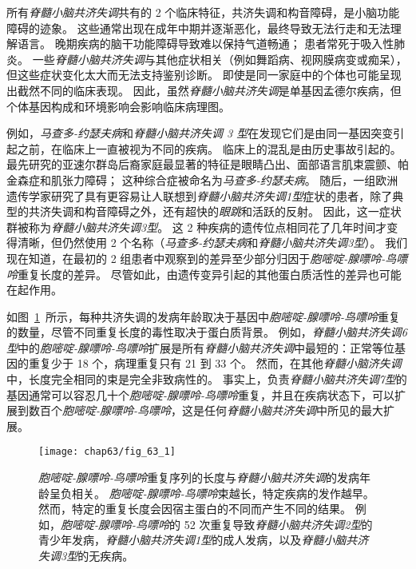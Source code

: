 所有\textit{脊髓小脑共济失调}共有的 2 个临床特征，共济失调和构音障碍，是小脑功能障碍的迹象。
这些通常出现在成年中期并逐渐恶化，最终导致无法行走和无法理解语言。
晚期疾病的脑干功能障碍导致难以保持气道畅通；
患者常死于吸入性肺炎。
一些\textit{脊髓小脑共济失调}与其他症状相关（例如舞蹈病、视网膜病变或痴呆），但这些症状变化太大而无法支持鉴别诊断。
即使是同一家庭中的个体也可能呈现出截然不同的临床表现。
因此，虽然\textit{脊髓小脑共济失调}是单基因孟德尔疾病，但个体基因构成和环境影响会影响临床病理图。


例如，\textit{马查多-约瑟夫病}和\textit{脊髓小脑共济失调 3 型}在发现它们是由同一基因突变引起之前，在临床上一直被视为不同的疾病。
临床上的混乱是由历史事故引起的。
最先研究的亚速尔群岛后裔家庭最显著的特征是眼睛凸出、面部语言肌束震颤、帕金森症和肌张力障碍；
这种综合症被命名为\textit{马查多-约瑟夫病}。
随后，一组欧洲遗传学家研究了具有更容易让人联想到\textit{脊髓小脑共济失调1型}症状的患者，除了典型的共济失调和构音障碍之外，还有超快的\textit{眼跳}和活跃的反射。
因此，这一症状群被称为\textit{脊髓小脑共济失调3型}。
这 2 种疾病的遗传位点相同花了几年时间才变得清晰，但仍然使用 2 个名称（\textit{马查多-约瑟夫病}和\textit{脊髓小脑共济失调3型}）。
我们现在知道，在最初的 2 组患者中观察到的差异至少部分归因于\textit{胞嘧啶-腺嘌呤-鸟嘌呤}重复长度的差异。
尽管如此，由遗传变异引起的其他蛋白质活性的差异也可能在起作用。


如图~\ref{fig:63_1}~所示，每种共济失调的发病年龄取决于基因中\textit{胞嘧啶-腺嘌呤-鸟嘌呤}重复的数量，尽管不同重复长度的毒性取决于蛋白质背景。
例如，\textit{脊髓小脑共济失调6型}中的\textit{胞嘧啶-腺嘌呤-鸟嘌呤}扩展是所有\textit{脊髓小脑共济失调}中最短的：正常等位基因的重复少于 18 个，病理重复只有 21 到 33 个。
然而，在其他\textit{脊髓小脑济失调}中，长度完全相同的束是完全非致病性的。
事实上，负责\textit{脊髓小脑共济失调7型}的基因通常可以容忍几十个\textit{胞嘧啶-腺嘌呤-鸟嘌呤}重复，并且在疾病状态下，可以扩展到数百个\textit{胞嘧啶-腺嘌呤-鸟嘌呤}，这是任何\textit{脊髓小脑共济失调}中所见的最大扩展。


\begin{figure}[htbp]
	\centering
	\texttt{[image: chap63/fig\_63\_1]}
	\caption{\textit{胞嘧啶-腺嘌呤-鸟嘌呤}重复序列的长度与\textit{脊髓小脑共济失调}的发病年龄呈负相关。
		\textit{胞嘧啶-腺嘌呤-鸟嘌呤}束越长，特定疾病的发作越早。
		然而，特定的重复长度会因宿主蛋白的不同而产生不同的结果。
		例如，\textit{胞嘧啶-腺嘌呤-鸟嘌呤}的 52 次重复导致\textit{脊髓小脑共济失调2型}的青少年发病，\textit{脊髓小脑共济失调1型}的成人发病，以及\textit{脊髓小脑共济失调3型}的无疾病。}
	\label{fig:63_1}
\end{figure}


